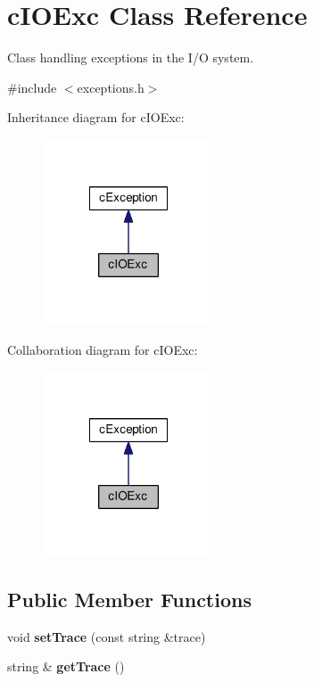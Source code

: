 \hypertarget{classcIOExc}{\section{c\-I\-O\-Exc \-Class \-Reference}
\label{d3/dbc/classcIOExc}
}


\-Class handling exceptions in the \-I/\-O system.  




{\ttfamily \#include $<$exceptions.\-h$>$}



\-Inheritance diagram for c\-I\-O\-Exc\-:\nopagebreak
\begin{figure}[H]
\begin{center}
\leavevmode
\includegraphics[width=144pt]{de/d6d/classcIOExc__inherit__graph}
\end{center}
\end{figure}


\-Collaboration diagram for c\-I\-O\-Exc\-:\nopagebreak
\begin{figure}[H]
\begin{center}
\leavevmode
\includegraphics[width=144pt]{df/db5/classcIOExc__coll__graph}
\end{center}
\end{figure}
\subsection*{\-Public \-Member \-Functions}
\begin{DoxyCompactItemize}
\item 
\hypertarget{classcIOExc_a8659256c4ce821f1b243d32c2164ad08}{void {\bfseries set\-Trace} (const string \&trace)}\label{d3/dbc/classcIOExc_a8659256c4ce821f1b243d32c2164ad08}

\item 
\hypertarget{classcIOExc_abf33ecff4f124c536a66fab8740d4e72}{string \& {\bfseries get\-Trace} ()}\label{d3/dbc/classcIOExc_abf33ecff4f124c536a66fab8740d4e72}

\end{DoxyCompactItemize}
